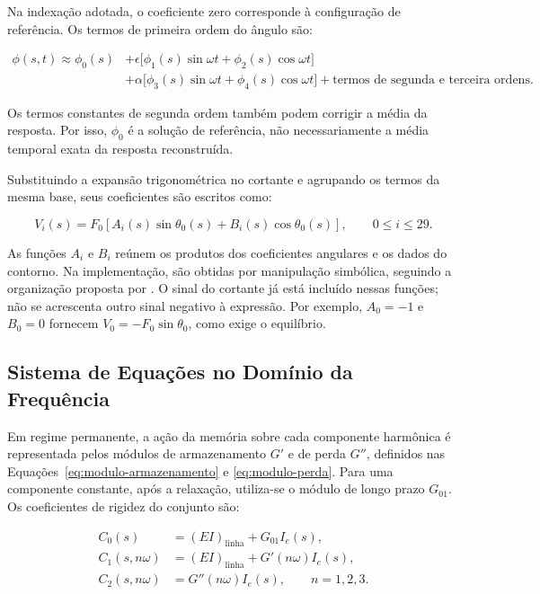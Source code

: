 \documentclass[arial,centeredequations,english,brazilian,oneside,section=TITLE]{ifes8}
\begin{document}
Na indexação adotada, o coeficiente zero corresponde à configuração de referência.
Os termos de primeira ordem do ângulo são:

\begin{equation}
  \begin{aligned}
    \phi(s,t)\approx\phi_0(s)
      &+\epsilon\bigl[\phi_1(s)\sin\omega t+\phi_2(s)\cos\omega t\bigr]\\
      &+\alpha\bigl[\phi_3(s)\sin\omega t+\phi_4(s)\cos\omega t\bigr]
      +\text{termos de segunda e terceira ordens}.
  \end{aligned}
  \label{eq:angulo-primeira-ordem}
\end{equation}

Os termos constantes de segunda ordem também podem corrigir a média da resposta.
Por isso, $\phi_0$ é a solução de referência, não necessariamente a média temporal
exata da resposta reconstruída.

Substituindo a expansão trigonométrica no cortante e agrupando os termos da mesma
base, seus coeficientes são escritos como:

\begin{equation}
  V_i(s)=F_0\left[A_i(s)\sin\theta_0(s)+B_i(s)\cos\theta_0(s)\right],
  \qquad 0\leq i\leq29.
  \label{eq:cortante-coeficientes-perturbativos}
\end{equation}

As funções $A_i$ e $B_i$ reúnem os produtos dos coeficientes angulares e os
dados do contorno. Na implementação, são obtidas por manipulação simbólica,
seguindo a organização proposta por . O sinal do cortante já está
incluído nessas funções; não se acrescenta outro sinal negativo à expressão.
Por exemplo, $A_0=-1$ e $B_0=0$ fornecem
$V_0=-F_0\sin\theta_0$, como exige o equilíbrio.

\subsection{Sistema de Equações no Domínio da Frequência}
\label{sec:governo-linear-frequencia}

Em regime permanente, a ação da memória sobre cada componente harmônica é
representada pelos módulos de armazenamento $G'$ e de perda $G''$, definidos
nas Equações~\eqref{eq:modulo-armazenamento} e \eqref{eq:modulo-perda}.
Para uma componente constante, após a relaxação, utiliza-se o módulo de longo
prazo $G_{01}$. Os coeficientes de rigidez do conjunto são:

\begin{align}
  C_0(s)&=(EI)_{\mathrm{linha}}+G_{01}I_e(s),
    \label{eq:rigidez-constante-linear}\\
  C_1(s,n\omega)&=(EI)_{\mathrm{linha}}+G'(n\omega)I_e(s),
    \label{eq:rigidez-armazenamento-linear}\\
  C_2(s,n\omega)&=G''(n\omega)I_e(s),\qquad n=1,2,3.
    \label{eq:rigidez-perda-linear}
\end{align}
\end{document}
